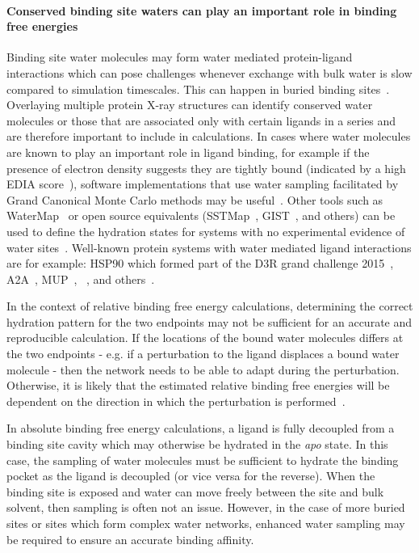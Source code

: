 \documentclass[9pt,bestpractices,pubversion]{livecoms}
\begin{document}
\paragraph{Conserved binding site waters can play an important role in binding free energies}
Binding site water molecules may form water mediated protein-ligand interactions which can pose challenges whenever exchange with bulk water is slow compared to simulation timescales. This can happen in buried binding sites~\cite{laage2017water}. Overlaying multiple protein X-ray structures can identify conserved water molecules or those that are associated only with certain ligands in a series and are therefore important to include in calculations. In cases where water molecules are known to play an important role in ligand binding, for example if the presence of electron density suggests they are tightly bound (indicated by a high EDIA score~\cite{nittinger2015evidence,meyder2017estimating}), software implementations that use water sampling facilitated by Grand Canonical Monte Carlo methods may be useful~\cite{michel2010prediction}. Other tools such as WaterMap~\cite{abel2008role,young2007motifs} or open source equivalents (SSTMap~\cite{haider2018solvation}, GIST~\cite{ramsey2016solvation}, and others) can be used to define the hydration states for systems with no experimental evidence of water sites~\cite{wang2011ligand}. Well-known protein systems with water mediated ligand interactions are for example: HSP90 which formed part of the D3R grand challenge 2015~\cite{mey2016blinded}, A2A~\cite{brucemacdonald2018ligand}, MUP~\cite{ross2015water}, ~\cite{deflorian2020accurate}, and others~\cite{michel2009energetics}.

In the context of relative binding free energy calculations, determining the correct hydration pattern for the two endpoints may not be sufficient for an accurate and reproducible calculation. If the locations of the bound water molecules differs at the two endpoints - e.g. if a perturbation to the ligand displaces a bound water molecule - then the network needs to be able to adapt during the perturbation. Otherwise, it is likely that the estimated relative binding free energies will be dependent on the direction in which the perturbation is performed~\cite{ross2020enhancing}.

In absolute binding free energy calculations, a ligand is fully decoupled from a binding site cavity which may otherwise be hydrated in the \textit{apo} state. In this case, the sampling of water molecules must be sufficient to hydrate the binding pocket as the ligand is decoupled (or vice versa for the reverse). When the binding site is exposed and water can move freely between the site and bulk solvent, then sampling is often not an issue. However, in the case of more buried sites or sites which form complex water networks, enhanced water sampling may be required to ensure an accurate binding affinity.
\end{document}
